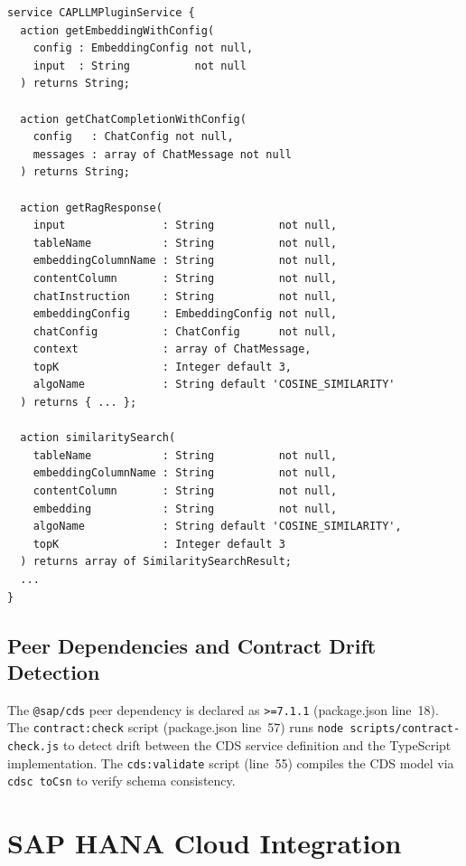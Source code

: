 \documentclass[11pt]{article}
\newcommand{\code}[1]{\texttt{#1}}
\begin{document}
\begin{lstlisting}[caption={Service definition excerpt (llm-service.cds lines 62--109)},label=lst:cds-service]
service CAPLLMPluginService {
  action getEmbeddingWithConfig(
    config : EmbeddingConfig not null,
    input  : String          not null
  ) returns String;

  action getChatCompletionWithConfig(
    config   : ChatConfig not null,
    messages : array of ChatMessage not null
  ) returns String;

  action getRagResponse(
    input               : String          not null,
    tableName           : String          not null,
    embeddingColumnName : String          not null,
    contentColumn       : String          not null,
    chatInstruction     : String          not null,
    embeddingConfig     : EmbeddingConfig not null,
    chatConfig          : ChatConfig      not null,
    context             : array of ChatMessage,
    topK                : Integer default 3,
    algoName            : String default 'COSINE_SIMILARITY'
  ) returns { ... };

  action similaritySearch(
    tableName           : String          not null,
    embeddingColumnName : String          not null,
    contentColumn       : String          not null,
    embedding           : String          not null,
    algoName            : String default 'COSINE_SIMILARITY',
    topK                : Integer default 3
  ) returns array of SimilaritySearchResult;
  ...
}
\end{lstlisting}

\subsection{Peer Dependencies and Contract Drift Detection}

The \code{@sap/cds} peer dependency is declared as \code{>=7.1.1}
(package.json line~18).  The \code{contract:check} script
(package.json line~57) runs \code{node scripts/contract-check.js} to
detect drift between the CDS service definition and the TypeScript
implementation.  The \code{cds:validate} script (line~55) compiles the
CDS model via \code{cdsc toCsn} to verify schema consistency.


\section{SAP HANA Cloud Integration}
\label{sec:hana}
\end{document}
